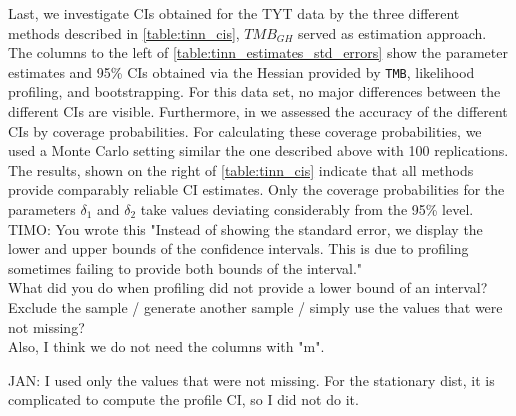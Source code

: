 \documentclass[bimj,fleqn]{w-art}\usepackage[]{graphicx}\usepackage[]{color}
\theoremstyle{plain}
\theoremstyle{definition}
\begin{document}
Last, we investigate CIs obtained for the TYT data by the three different methods described in \autoref{table:tinn_cis}, $TMB_{GH}$ served as estimation approach. The columns to the left of \autoref{table:tinn_estimates_std_errors} show the parameter estimates and 95\% CIs obtained via the Hessian provided by {\tt TMB}, likelihood profiling, and bootstrapping. For this data set, no major differences between the different CIs are visible. Furthermore, in we assessed the accuracy of the different CIs by coverage probabilities. For calculating these coverage probabilities, we used a Monte Carlo setting similar the one described above with 100 replications. The results, shown on the right of \autoref{table:tinn_cis} indicate that all methods provide comparably reliable CI estimates. Only the coverage probabilities for the parameters $\delta_1$ and $\delta_2$ take values deviating considerably from the 95\% level.\\[1ex]



TIMO: You wrote this "Instead of showing the standard error, we display the lower and upper bounds of the confidence intervals. This is due to profiling sometimes failing to provide both bounds of the interval."\\
What did you do when profiling did not provide a lower bound of an interval? Exclude the sample / generate another sample / simply use the values that were not missing?\\
Also, I think we do not need the columns with "m".

JAN: I used only the values that were not missing. For the stationary dist, it is complicated to compute the profile CI, so I did not do it.
\end{document}

